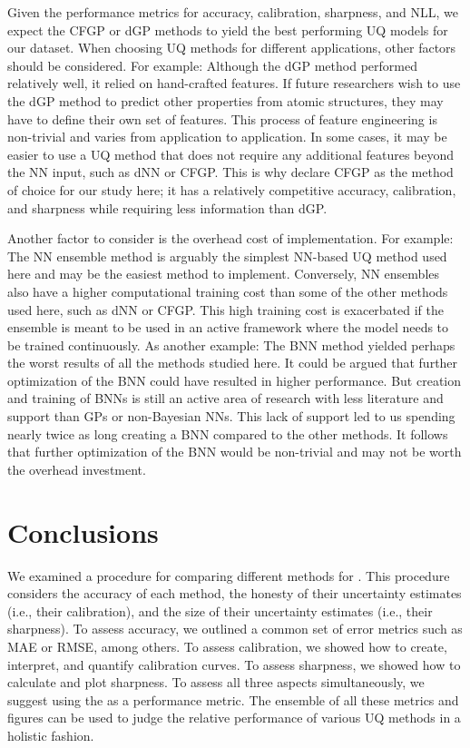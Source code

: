 \documentclass[]{achemso}
\begin{document}
Given the performance metrics for accuracy, calibration, sharpness, and \gls{NLL}, we expect the \gls{CFGP} or \gls{dGP} methods to yield the best performing \gls{UQ} models for our dataset.
When choosing \gls{UQ} methods for different applications, other factors should be considered.
For example:  Although the \gls{dGP} method performed relatively well, it relied on hand-crafted features.
If future researchers wish to use the \gls{dGP} method to predict other properties from atomic structures, they may have to define their own set of features.
This process of feature engineering is non-trivial and varies from application to application.
In some cases, it may be easier to use a \gls{UQ} method that does not require any additional features beyond the \gls{NN} input, such as \gls{dNN} or \gls{CFGP}.
This is why declare \gls{CFGP} as the method of choice for our study here; it has a relatively competitive accuracy, calibration, and sharpness while requiring less information than \gls{dGP}.

Another factor to consider is the overhead cost of implementation.
For example:  The \gls{NN} ensemble method is arguably the simplest \gls{NN}-based \gls{UQ} method used here and may be the easiest method to implement.
Conversely, \gls{NN} ensembles also have a higher computational training cost than some of the other methods used here, such as \gls{dNN} or \gls{CFGP}.
This high training cost is exacerbated if the ensemble is meant to be used in an active framework where the model needs to be trained continuously.
As another example:  The \gls{BNN} method yielded perhaps the worst results of all the methods studied here.
It could be argued that further optimization of the \gls{BNN} could have resulted in higher performance.
But creation and training of \gls{BNN}s is still an active area of research with less literature and support than \gls{GP}s or non-Bayesian \gls{NN}s.
This lack of support led to us spending nearly twice as long creating a \gls{BNN} compared to the other methods.
It follows that further optimization of the \gls{BNN} would be non-trivial and may not be worth the overhead investment.



\section{Conclusions}

We examined a procedure for comparing different methods for .
This procedure considers the accuracy of each method, the honesty of their uncertainty estimates (i.e., their calibration), and the size of their uncertainty estimates (i.e., their sharpness).
To assess accuracy, we outlined a common set of error metrics such as \gls{MAE} or \gls{RMSE}, among others.
To assess calibration, we showed how to create, interpret, and quantify calibration curves.
To assess sharpness, we showed how to calculate and plot sharpness.
To assess all three aspects simultaneously, we suggest using the  as a performance metric.
The ensemble of all these metrics and figures can be used to judge the relative performance of various \gls{UQ} methods in a holistic fashion.
\end{document}
